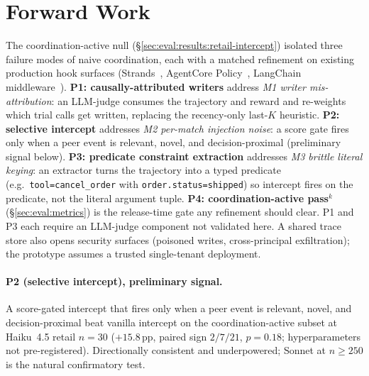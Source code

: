 \section{Forward Work}
\label{sec:proposals}
\label{sec:discussion}

The coordination-active null
(\S\ref{sec:eval:results:retail-intercept}) isolated three failure
modes of naive coordination, each with a matched refinement on
existing production hook surfaces (Strands~\cite{strandshooks2025},
AgentCore Policy~\cite{agentcorepolicy2025}, LangChain
middleware~\cite{langchainmiddleware2026}).
\textbf{P1: causally-attributed writers} address \emph{M1
writer mis-attribution}: an LLM-judge consumes the trajectory
and reward and re-weights which trial calls get written, replacing
the recency-only last-$K$ heuristic.
\textbf{P2: selective intercept} addresses \emph{M2 per-match
injection noise}: a score gate fires only when a peer event is
relevant, novel, and decision-proximal (preliminary signal below).
\textbf{P3: predicate constraint extraction} addresses \emph{M3
brittle literal keying}: an extractor turns the trajectory into a
typed predicate (e.g.\ \texttt{tool=cancel\_order} with
\texttt{order.status=shipped}) so intercept fires on the
predicate, not the literal argument tuple.
\textbf{P4: coordination-active pass$^k$}
(\S\ref{sec:eval:metrics}) is the release-time gate any refinement
should clear. P1 and P3 each require an LLM-judge component not
validated here. A shared trace store also opens security surfaces
(poisoned writes, cross-principal exfiltration); the prototype
assumes a trusted single-tenant deployment.

\paragraph{P2 (selective intercept), preliminary signal.}
A score-gated intercept that fires only when a peer event is
relevant, novel, and decision-proximal beat vanilla intercept on
the coordination-active subset at Haiku~4.5 retail $n{=}30$
($+15.8$\,pp, paired sign $2/7/21$, $p{=}0.18$; hyperparameters
not pre-registered). Directionally consistent and underpowered;
Sonnet at $n{\geq}250$ is the natural confirmatory test.
